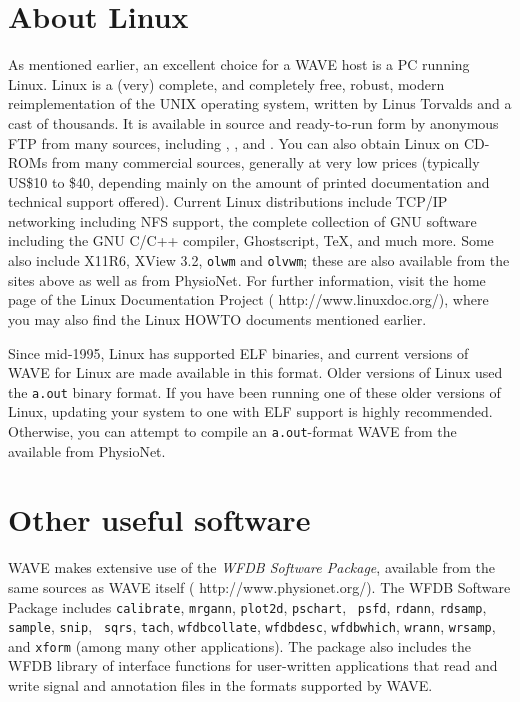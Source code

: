 \documentclass[twoside]{book}
\newcommand{\WAVE}{{\sf WAVE}\xspace}
\begin{document}
\section{About Linux}

\label{sec:linux}
As mentioned earlier, an excellent choice for a \WAVE{}
host is a PC running Linux.  Linux is a (very) complete, and
completely free, robust, modern reimplementation of the UNIX operating
system, written by Linus Torvalds and a cast of thousands.  It is
available in source and ready-to-run form by anonymous FTP from many
sources, including
,
, and
.
You can also obtain Linux on CD-ROMs from many
commercial sources, generally at very low prices (typically US\$10 to
\$40, depending mainly on the amount of printed documentation and
technical support offered).  Current Linux distributions include
TCP/IP networking including NFS
support, the complete collection of GNU software including the GNU
C/C++ compiler, Ghostscript, \TeX, and much more.  Some also include
X11R6, XView 3.2, {\tt olwm} and {\tt olvwm};  these are also available
from the sites above as well as from PhysioNet.  For further
information, visit the home page of the Linux Documentation Project
(
{http://www.linuxdoc.org/}), where you may also find the Linux HOWTO
documents mentioned earlier.

Since mid-1995, Linux has supported ELF binaries, and current versions
of \WAVE{} for Linux are made available in this format.  Older
versions of Linux used the {\tt a.out} binary format.  If you have
been running one of these older versions of Linux, updating your system
to one with ELF support is highly recommended.  Otherwise, you can attempt
to compile an {\tt a.out}-format WAVE from the
available from PhysioNet.

\section{Other useful software}
\label{sec:other-software}

\WAVE{} makes extensive use of the \emph{WFDB Software Package}, available from
the same sources as \WAVE{} itself
(
{http://www.physionet.org/}).  The WFDB Software Package includes
{\tt calibrate}, {\tt mrgann}, {\tt plot2d}, {\tt pschart}, {\tt
psfd}, {\tt rdann}, {\tt rdsamp}, {\tt sample}, {\tt snip}, {\tt
sqrs}, {\tt tach}, {\tt wfdbcollate}, {\tt wfdbdesc}, {\tt wfdbwhich},
{\tt wrann}, {\tt wrsamp}, and {\tt xform} (among many other applications).
The package also includes the WFDB library of interface functions for
user-written applications that read and write signal and annotation
files in the formats supported by \WAVE{}.
\end{document}
